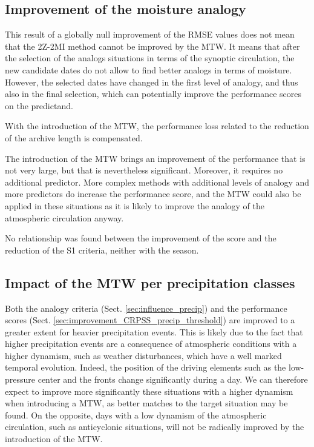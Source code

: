 \documentclass[hess, manuscript]{copernicus}
\begin{document}
\subsection{Improvement of the moisture analogy}




This result of a globally null improvement of the RMSE values does not mean that the 2Z-2MI method cannot be improved by the MTW. It means that after the selection of the analogs situations in terms of the synoptic circulation, the new candidate dates do not allow to find better analogs in terms of moisture. However, the selected dates have changed in the first level of analogy, and thus also in the final selection, which can potentially improve the performance scores on the predictand.




With the introduction of the MTW, the performance loss related to the reduction of the archive length is compensated.



The introduction of the MTW brings an improvement of the performance that is not very large, but that is nevertheless significant. Moreover, it requires no additional predictor. More complex methods with additional levels of analogy and more predictors do increase the performance score, and the MTW could also be applied in these situations as it is likely to improve the analogy of the atmospheric circulation anyway. 

No relationship was found between the improvement of the score and the reduction of the S1 criteria, neither with the season.


\subsection{Impact of the MTW per precipitation classes}

Both the analogy criteria (Sect. \ref{sec:influence_precip}) and the performance scores (Sect. \ref{sec:improvement_CRPSS_precip_threshold}) are improved to a greater extent for heavier precipitation events. This is likely due to the fact that higher precipitation events are a consequence of atmospheric conditions with a higher dynamism, such as weather disturbances, which have a well marked temporal evolution. Indeed, the position of the driving elements such as the low-pressure center and the fronts change significantly during a day. We can therefore expect to improve more significantly these situations with a higher dynamism when introducing a MTW, as better matches to the target situation may be found. On the opposite, days with a low dynamism of the atmospheric circulation, such as anticyclonic situations, will not be radically improved by the introduction of the MTW.
\end{document}
